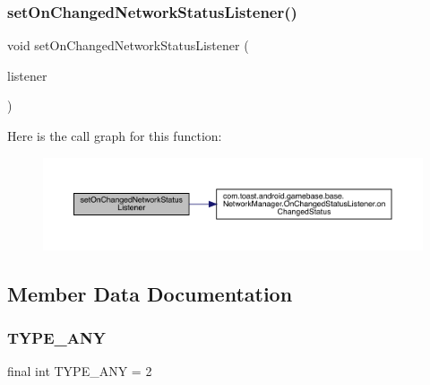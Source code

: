 \subsubsection{\texorpdfstring{set\+On\+Changed\+Network\+Status\+Listener()}{setOnChangedNetworkStatusListener()}}
{\footnotesize\ttfamily void set\+On\+Changed\+Network\+Status\+Listener (\begin{DoxyParamCaption}\item[{\hyperlink{interfacecom_1_1toast_1_1android_1_1gamebase_1_1base_1_1_network_manager_1_1_on_changed_status_listener}{On\+Changed\+Status\+Listener}}]{listener }\end{DoxyParamCaption})}

Here is the call graph for this function\+:
\nopagebreak
\begin{figure}[H]
\begin{center}
\leavevmode
\includegraphics[width=350pt]{classcom_1_1toast_1_1android_1_1gamebase_1_1base_1_1_network_manager_a1523a830067dcd68416469f34b750527_cgraph}
\end{center}
\end{figure}


\subsection{Member Data Documentation}
\mbox{\label{classcom_1_1toast_1_1android_1_1gamebase_1_1base_1_1_network_manager_ac89feff3bdce716ffc4abafec7cc04d4}} 
\subsubsection{\texorpdfstring{T\+Y\+P\+E\+\_\+\+A\+NY}{TYPE\_ANY}}
{\footnotesize\ttfamily final int T\+Y\+P\+E\+\_\+\+A\+NY = 2\hspace{0.3cm}{\ttfamily [static]}}

